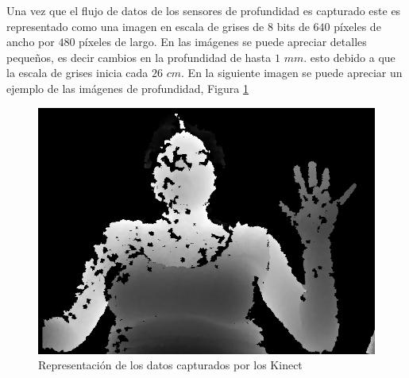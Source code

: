 Una vez que el flujo de datos de los sensores de profundidad es capturado este es representado como una imagen en escala de grises de $8$ bits de $640$ p\'ixeles de ancho por $480$ p\'ixeles de largo. En las imágenes se puede apreciar detalles pequeños, es decir cambios en la profundidad de hasta $1$  $mm.$ esto debido a que la escala de grises inicia cada $26$  $cm$. 
En la siguiente imagen se puede apreciar un ejemplo de las imágenes de profundidad, Figura \ref{fig:ImagenCapturada}

\begin{figure}[h!]
\begin{center}
\includegraphics[scale=.35]{./Figures/166.png}
\end{center}
\caption{Representación de los datos capturados por los Kinect}
\label{fig:ImagenCapturada}
\end{figure}  

